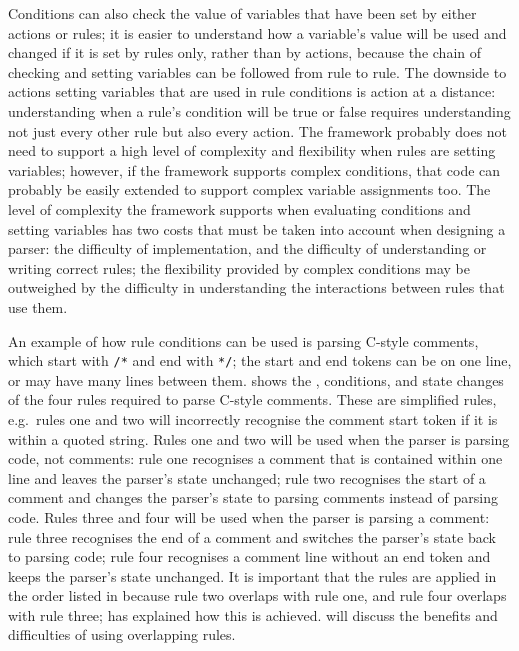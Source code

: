 Conditions can also check the value of variables that have been set by
either actions or rules; it is easier to understand how a variable's value
will be used and changed if it is set by rules only, rather than by
actions, because the chain of checking and setting variables can be
followed from rule to rule.  The downside to actions setting variables that
are used in rule conditions is action at a distance: understanding when a
rule's condition will be true or false requires understanding not just
every other rule but also every action.  The framework probably does not
need to support a high level of complexity and flexibility when rules are
setting variables; however, if the framework supports complex conditions,
that code can probably be easily extended to support complex variable
assignments too.  The level of complexity the framework supports when
evaluating conditions and setting variables has two costs that must be
taken into account when designing a parser: the difficulty of
implementation, and the difficulty of understanding or writing correct
rules; the flexibility provided by complex conditions may be outweighed by
the difficulty in understanding the interactions between rules that use
them.

An example of how rule conditions can be used is parsing C-style comments,
which start with \texttt{/*} and end with \texttt{*/}; the start and end
tokens can be on one line, or may have many lines between them.
 shows the \regexes{},
conditions, and state changes of the four rules required to parse C-style
comments.  These are simplified rules, e.g.\ rules one and two will
incorrectly recognise the comment start token if it is within a quoted
string.  Rules one and two will be used when the parser is parsing code,
not comments: rule one recognises a comment that is contained within one
line and leaves the parser's state unchanged; rule two recognises the start
of a comment and changes the parser's state to parsing comments instead of
parsing code.  Rules three and four will be used when the parser is parsing
a comment: rule three recognises the end of a comment and switches the
parser's state back to parsing code; rule four recognises a comment line
without an end token and keeps the parser's state unchanged.  It is
important that the rules are applied in the order listed in  because rule two overlaps with rule one, and
rule four overlaps with rule three;  has
explained how this is achieved.   will discuss the benefits and difficulties of using
overlapping rules.

